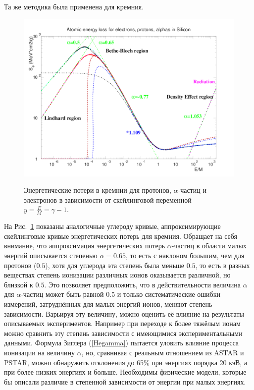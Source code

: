 \documentclass[a4paper,12pt]{article}
\begin{document}
\begin{large}
  Та же методика была применена для кремния.
    \begin{figure}[ht]
    {
       \includegraphics[width=0.99\linewidth]{images/epa_si_l}
    }
    \caption{Энергетические потери в кремнии для протонов, $\alpha$-частиц и электронов в зависимости от скейлинговой переменной $y=\frac{E}{M}=\gamma-1$.}
    \label{fig:dEdxSiL}
  \end{figure}
  На Рис.~\ref{fig:dEdxSiL} показаны аналогичные углероду кривые, аппроксимирующие скейлинговые кривые энергетических потерь для кремния.
  Обращает на себя внимание, что аппроксимация энергетических потерь $\alpha$-частиц в области малых энергий описывается степенью $\alpha=0.65$, то есть с наклоном большим, чем для протонов ($0.5$), хотя для углерода эта степень была меньше $0.5$, то есть в разных веществах степень ионизации различных ионов оказывается различной, но близкой к $0.5$.
  Это позволяет предположить, что в действительности величина $\alpha$ для $\alpha$-частиц может быть равной $0.5$ и только систематические ошибки измерений, затруднённых для малых энергий ионов, меняют степень зависимости.
  Варьируя эту величину, можно оценить её влияние на результаты описываемых экспериментов.
  Например при переходе к более тяжёлым ионам можно сравнить эту степень зависимости с имеющимися экспериментальными данными.
  Формула Зиглера (\ref{Hegamma}) пытается уловить влияние процесса ионизации на величину $\alpha$, но, сравнивая с реальным отношением из ASTAR и PSTAR, можно обнаружить отклонения до 65\% при энергиях порядка 20 кэВ, а при более низких энергиях и больше.
  Необходимы физические модели, которые бы описали различие в степенной зависимости от энергии при малых энергиях.

\end{large}
\end{document}
